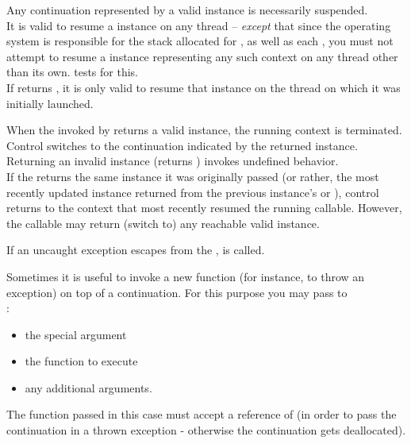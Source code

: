 Any continuation represented by a valid \cont instance is necessarily suspended.\\
It is valid to resume a \cont instance on any thread -- \emph{except} that
since the operating system is responsible for the stack allocated for \main,
as well as each , you must not attempt to resume a \cont
instance representing any such context on any thread other
than its own.  tests for this.\\
If  returns , it is
only valid to resume that \cont instance on the thread on which it was initially
launched.


When the \entryfn invoked by \cc returns a valid \cont instance,
the running context is terminated. Control switches to the continuation
indicated by the returned \cont instance.\\
Returning an invalid \cont instance (\opbool returns ) invokes
undefined behavior.\\
If the \entryfn returns the same \cont instance it was originally
passed (or rather, the most recently updated instance returned from the
previous instance's \call or \resume), control returns to the context that most
recently resumed the running callable. However, the callable may return (switch
to) any reachable valid \cont instance.


\label{subsec:exceptions}
If an uncaught exception escapes from the \entryfn,  is
called.


Sometimes it is useful to invoke a new function (for instance, to throw an
exception) on top of a continuation. For this purpose you may pass to\\
:

\begin{itemize}
  \item the special argument 
  \item the function to execute
  \item any additional arguments.
\end{itemize}

The function passed in this case must accept a reference of \cont (in order to
pass the continuation in a thrown exception - otherwise the continuation gets
deallocated).\\

